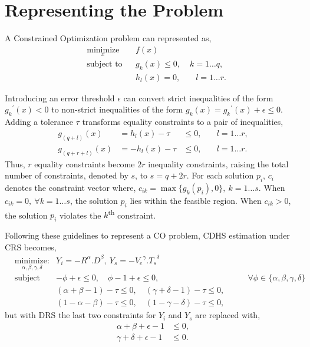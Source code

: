 \documentclass[9pt]{article}
\begin{document}
\section{Representing the Problem}\label{sec:rep}

A Constrained Optimization problem can represented as,
\begin{equation*}
  \begin{aligned}
    & \underset{x}{\text{minimize}}
    & & f(x) \\
    & \text{subject to}
    & & g_k(x) \leq 0,&\; k = 1\dots q,\\
    &&& h_l(x) = 0,&\quad l = 1\dots r.
  \end{aligned}
\end{equation*}

Introducing an error threshold $\epsilon$ can convert strict inequalities of the form ${g_k}^{\prime}(x) < 0$ to
non-strict inequalities of the form $g_k(x) = {g_k}^{\prime}(x) + \epsilon \leq 0$. Adding a tolerance $\tau$ transforms
equality constraints to a pair of inequalities,
\begin{equation*}
  \begin{aligned}
    g_{(q+l)}(x) &= h_l(x) - \tau &\leq 0,&\quad l = 1\dots r,\\
    g_{(q+r+l)}(x) &= {-}h_l(x) - \tau &\leq 0,&\quad l = 1\dots r.
  \end{aligned}
\end{equation*}
Thus, $r$ equality constraints become $2r$ inequality constraints, raising the total number of constraints, denoted by
$s$, to $s = q + 2r$. For each solution $p_i$, $c_i$ denotes the constraint vector where, $c_{ik} = \max\{g_k(p_i),
0\},~k=1\dots s$. When $c_{ik} = 0,~\forall k=1\dots s$, the solution $p_i$ lies within the feasible region. When $c_{ik} > 0$,
the solution $p_i$ violates the $k$\textsuperscript{th} constraint.

Following these guidelines to represent a CO problem, CDHS estimation under CRS becomes,
\begin{equation}\label{eq:cdhscrs}
  \begin{aligned}
    & \underset{\alpha,\beta,\gamma,\delta}{\text{minimize:}}
    & Y_i = {-}R^\alpha.D^\beta,\ Y_s = {-}{V_e}^\gamma.{T_s}^\delta\\
    & \text{subject to:}
    &  {-}\phi + \epsilon \leq 0,\quad\phi - 1 + \epsilon \leq 0, &\quad\quad \forall \phi\in\{\alpha,\beta,\gamma,\delta\}\\
    && (\alpha+\beta-1) - \tau \leq 0,\quad(\gamma+\delta-1) - \tau \leq 0,\\
    && (1-\alpha-\beta) - \tau \leq 0,\quad(1-\gamma-\delta) - \tau \leq 0,
  \end{aligned}
\end{equation}
but with DRS the last two constraints for $Y_i$ and $Y_s$ are replaced with,
\begin{equation}\label{eq:cdhsdrs}
  \begin{aligned}
    \alpha + \beta + \epsilon - 1 &\leq 0,\\
    \gamma + \delta + \epsilon - 1 &\leq 0.
  \end{aligned}
\end{equation}
\end{document}
